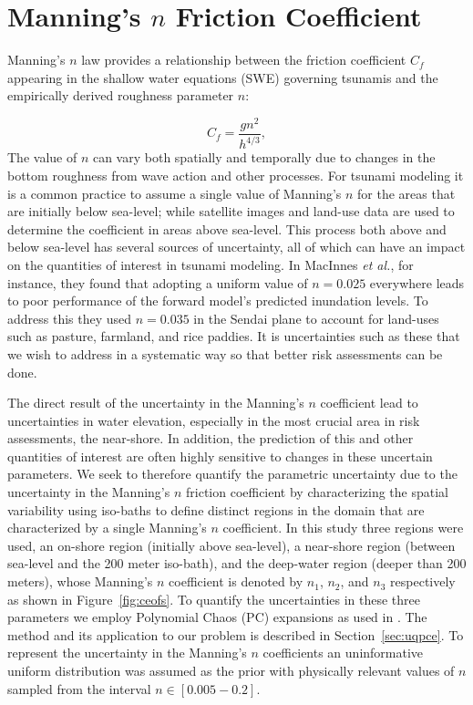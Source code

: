\section{Manning’s $n$ Friction Coefficient} \label{sec:manning}

Manning's $n$ law provides a relationship between the friction coefficient
$C_f$ appearing in the shallow water equations (SWE) governing tsunamis and 
the empirically derived roughness parameter $n$:

\begin{equation}
    C_f = \frac{g n^2}{h^{4/3}},
\label{eq:coef}
\end{equation}
The value of $n$ can vary both spatially and temporally due to changes in the
bottom roughness from wave action and other processes.  For tsunami modeling it
is a common practice to assume a single value of Manning's $n$ for the areas
that are initially below sea-level; while satellite images and 
land-use data are used to determine the coefficient in areas above sea-level.  This
process both above and below sea-level has several sources of uncertainty, all
of which can have an impact on the quantities of interest in tsunami modeling.   
In MacInnes \emph{et al.}, for instance, they found that adopting a uniform value 
of $n = 0.025$ everywhere leads to poor performance of the forward model's predicted 
inundation levels.  To address this they used $n = 0.035$ in the Sendai plane to 
account for land-uses such as pasture, farmland, and rice paddies.  It is 
uncertainties such as these that we wish to address in a systematic way so that
better risk assessments 
can be done.

The direct result of the uncertainty in the Manning's $n$ coefficient lead to
uncertainties in water elevation,
especially in the most crucial area in risk assessments, the near-shore. In 
addition,  the prediction of this and other quantities of interest are often highly 
sensitive to changes in these uncertain parameters.  We seek to therefore 
quantify the parametric uncertainty due to the uncertainty in the Manning's $n$ 
friction coefficient by characterizing the spatial variability using
iso-baths to define distinct regions in the domain that are characterized by a
single Manning's $n$ coefficient.  In this study three regions were used, an
on-shore region (initially above sea-level), a near-shore region (between
sea-level and the 200 meter iso-bath), and the deep-water region (deeper than
200 meters), whose Manning's $n$ coefficient is denoted by $n_1$, $n_2$, and $n_3$ respectively 
as shown in Figure~\ref{fig:ceofs}. To quantify the uncertainties
in these three parameters we employ Polynomial Chaos (PC) 
expansions as used in \cite{sraj:2013a,sraj:2013b}.  The method and its 
application to our problem is
described in Section~\ref{sec:uqpce}.  To represent the uncertainty in the
Manning's $n$ coefficients an uninformative uniform distribution was assumed as 
the prior with physically relevant values of $n$ sampled from the interval 
$n \in [0.005-0.2]$.

